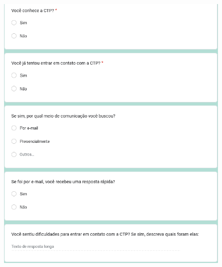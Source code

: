 \documentclass[12pt,a4paper]{article}
\begin{document}
\newpage

\begin{figure}[H]
    \centering
     \includegraphics[width=15cm]{foto2.png}
\end{figure}
\end{document}
